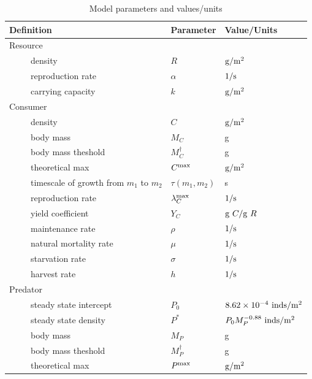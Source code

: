 \documentclass[]{rsos}%
\begin{document}
\clearpage


\begin{table}[h]
    \caption{Model parameters and values/units}
    \label{tab:param}
        \begin{center}
        \footnotesize
         \begin{tabular}{lll}
         \hline
         Definition & Parameter & Value/Units   \\ %
         \hline
         Resource & & \\
         ~~~~~density & $R$ & ${\rm g/m^2}$ \\
         ~~~~~reproduction rate & $\alpha$ & ${\rm 1/s}$ \\
         ~~~~~carrying capacity & $k$ & ${\rm g/m^2}$ \\
         \hline
         Consumer & & \\
         ~~~~~density & $C$ & ${\rm g/m^2}$ \\
         ~~~~~body mass & $M_C$ & g \\
         ~~~~~body mass theshold & $M_C^\dagger$ & g \\
         ~~~~~theoretical max & $C^{\rm max}$ & ${\rm g/m^2}$ \\
         ~~~~~timescale of growth from $m_1$ to $m_2$ & $\tau(m_1,m_2)$ & s \\
         ~~~~~reproduction rate & $\lambda_C^{\rm max}$ & ${\rm 1/s}$ \\
         ~~~~~yield coefficient & $Y_C$ & ${\rm g~}C/{\rm  g~} R$ \\
         ~~~~~maintenance rate & $\rho$ & ${\rm 1/s}$ \\
         ~~~~~natural mortality rate & $\mu$ & ${\rm 1/s}$ \\
         ~~~~~starvation rate & $\sigma$ & ${\rm 1/s}$ \\
         ~~~~~harvest rate & $h$ & ${\rm 1/s}$ \\
         \hline
         Predator & & \\
         ~~~~~steady state intercept & $P_0$ & $8.62\times10^{-4}~{\rm inds/m^2}$\cite{carbone2002common} \\
         ~~~~~steady state density & $P^*$ &  $P_0 M_P^{-0.88}~{\rm inds/m^2}$\cite{carbone2002common} \\
         ~~~~~body mass & $M_P$ & g \\
         ~~~~~body mass theshold & $M_P^\dagger$ & g \\
         ~~~~~theoretical max & $P^{\rm max}$ & ${\rm g/m^2}$ \\

\end{tabular}
\end{center}
\end{table}
\end{document}
